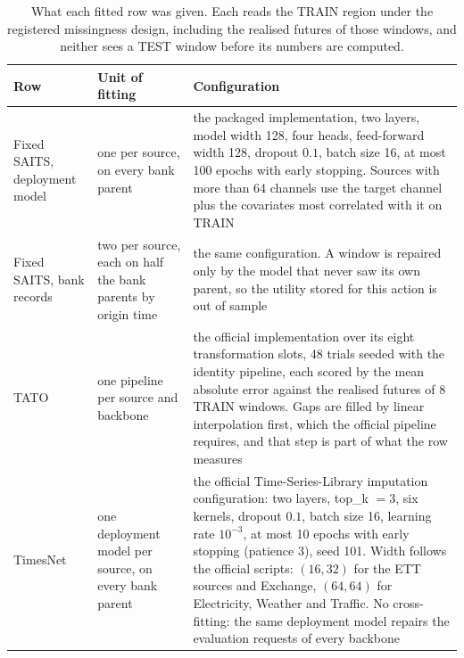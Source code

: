 \documentclass{article}
\begin{document}
\begin{table}[!t]
  \caption{What each fitted row was given. Each reads the TRAIN region under the registered
  missingness design, including the realised futures of those windows, and neither sees a
  TEST window before its numbers are computed.}
  \label{tab:app-baselinecfg}
  \centering
  \small
  \setlength{\tabcolsep}{4pt}
\begin{tabular}{@{}p{} p{} p{}@{}}
    \toprule
    Row & Unit of fitting & Configuration \\
    \midrule
    Fixed SAITS, deployment model & one per source, on every bank parent & the packaged implementation, two layers, model width 128, four heads, feed-forward width 128, dropout $0.1$, batch size 16, at most 100 epochs with early stopping. Sources with more than 64 channels use the target channel plus the covariates most correlated with it on TRAIN \\
    Fixed SAITS, bank records & two per source, each on half the bank parents by origin time & the same configuration. A window is repaired only by the model that never saw its own parent, so the utility stored for this action is out of sample \\
    TATO & one pipeline per source and backbone & the official implementation over its eight transformation slots, 48 trials seeded with the identity pipeline, each scored by the mean absolute error against the realised futures of 8 TRAIN windows. Gaps are filled by linear interpolation first, which the official pipeline requires, and that step is part of what the row measures \\
    TimesNet & one deployment model per source, on every bank parent & the official Time-Series-Library imputation configuration: two layers, top\_k $=3$, six kernels, dropout $0.1$, batch size 16, learning rate $10^{-3}$, at most 10 epochs with early stopping (patience 3), seed 101. Width follows the official scripts: $(16,32)$ for the ETT sources and Exchange, $(64,64)$ for Electricity, Weather and Traffic. No cross-fitting: the same deployment model repairs the evaluation requests of every backbone \\
    \bottomrule
  \end{tabular}
\end{table}
\end{document}
